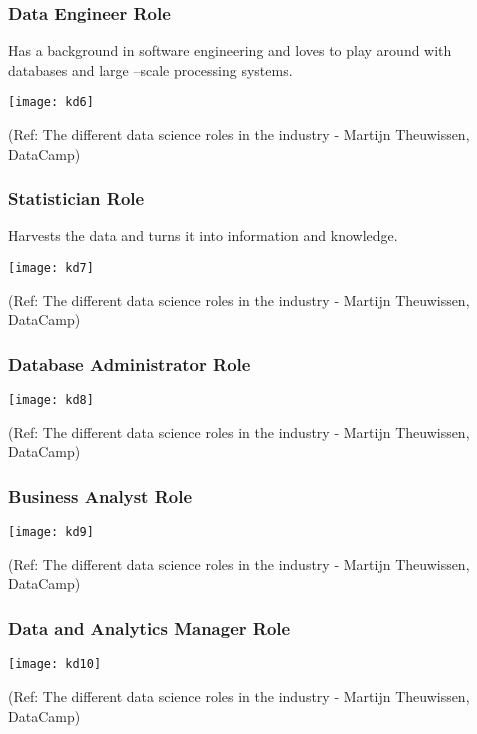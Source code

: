 \begin{frame}[fragile]\frametitle{Data Engineer Role}
Has a background in software engineering and loves to play around with databases and large –scale processing systems.

\begin{center}
\texttt{[image: kd6]}
\end{center}

{\tiny (Ref: The different data science roles in the industry - Martijn Theuwissen, DataCamp)}
\end{frame}

\begin{frame}[fragile]\frametitle{Statistician Role}
Harvests the data and turns it into information and knowledge.

\begin{center}
\texttt{[image: kd7]}
\end{center}

{\tiny (Ref: The different data science roles in the industry - Martijn Theuwissen, DataCamp)}
\end{frame}

\begin{frame}[fragile]\frametitle{Database Administrator Role}

\begin{center}
\texttt{[image: kd8]}
\end{center}

{\tiny (Ref: The different data science roles in the industry - Martijn Theuwissen, DataCamp)}
\end{frame}

\begin{frame}[fragile]\frametitle{Business Analyst Role}

\begin{center}
\texttt{[image: kd9]}
\end{center}

{\tiny (Ref: The different data science roles in the industry - Martijn Theuwissen, DataCamp)}
\end{frame}

\begin{frame}[fragile]\frametitle{Data and Analytics Manager Role}

\begin{center}
\texttt{[image: kd10]}
\end{center}

{\tiny (Ref: The different data science roles in the industry - Martijn Theuwissen, DataCamp)}
\end{frame}


